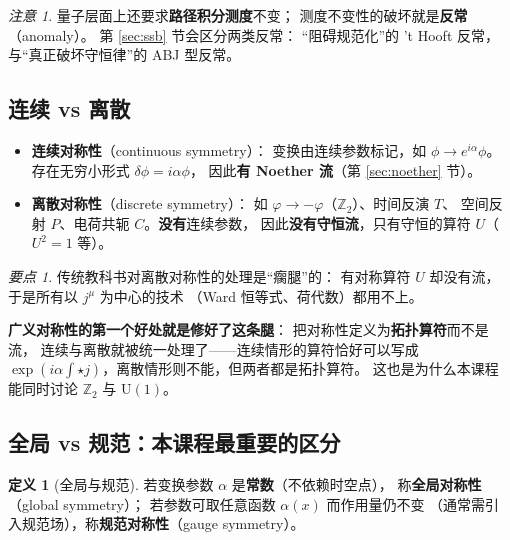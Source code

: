 \documentclass[UTF8,a4paper,11pt]{ctexart}
\theoremstyle{plain}
\theoremstyle{definition}
\newtheorem{definition}{定义}[section]
\theoremstyle{remark}
\newtheorem{keypoint}{要点}[section]
\newtheorem{warning}{注意}[section]
\newcommand{\hs}{\star}                %
\newcommand{\ZZ}{\mathbb{Z}}
\newcommand{\Uone}{\mathrm{U}(1)}
\newcommand{\en}[1]{\textsf{#1}}       %
\begin{document}
\begin{warning}
量子层面上还要求\textbf{路径积分测度}不变；
测度不变性的破坏就是\textbf{反常}（\en{anomaly}）。
第 \ref{sec:ssb} 节会区分两类反常：
“阻碍规范化”的 't Hooft 反常，与“真正破坏守恒律”的 ABJ 型反常。
\end{warning}

\subsection{连续 vs 离散}

\begin{itemize}
  \item \textbf{连续对称性}（\en{continuous symmetry}）：
        变换由连续参数标记，如 $\phi\to e^{i\alpha}\phi$。
        存在无穷小形式 $\delta\phi=i\alpha\phi$，
        因此\textbf{有 Noether 流}（第 \ref{sec:noether} 节）。
  \item \textbf{离散对称性}（\en{discrete symmetry}）：
        如 $\varphi\to-\varphi$（$\ZZ_2$）、时间反演 $T$、
        空间反射 $P$、电荷共轭 $C$。\textbf{没有}连续参数，
        因此\textbf{没有守恒流}，只有守恒的算符 $U$（$U^2=1$ 等）。
\end{itemize}

\begin{keypoint}
\label{kp:discrete}
传统教科书对离散对称性的处理是“瘸腿”的：
有对称算符 $U$ 却没有流，于是所有以 $j^\mu$ 为中心的技术
（Ward 恒等式、荷代数）都用不上。

\textbf{广义对称性的第一个好处就是修好了这条腿}：
把对称性定义为\textbf{拓扑算符}而不是流，
连续与离散就被统一处理了——连续情形的算符恰好可以写成
$\exp(i\alpha\int\hs j)$，离散情形则不能，但两者都是拓扑算符。
这也是为什么本课程能同时讨论 $\ZZ_2$ 与 $\Uone$。
\end{keypoint}

\subsection{全局 vs 规范：本课程最重要的区分}
\label{subsec:global-vs-gauge}

\begin{definition}[全局与规范]
若变换参数 $\alpha$ 是\textbf{常数}（不依赖时空点），
称\textbf{全局对称性}（\en{global symmetry}）；
若参数可取任意函数 $\alpha(x)$ 而作用量仍不变
（通常需引入规范场），称\textbf{规范对称性}（\en{gauge symmetry}）。
\end{definition}
\end{document}
